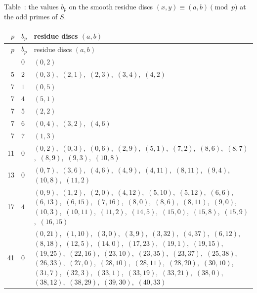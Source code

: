 \documentclass[11pt]{article}
\newcounter{dtab}
\begin{document}
{\footnotesize\setlength{\tabcolsep}{4pt}\setlength{\LTpre}{6pt}\setlength{\LTpost}{3pt}\renewcommand{\arraystretch}{1.05}
\begin{center}
\label{tab:local8odd}
Table~\thedtab: the values $b_p$ on the smooth residue discs $(x,y)\equiv(a,b)\pmod p$ at the odd primes of $S$.
\end{center}
\begin{longtable}{@{}rl>{\raggedright\arraybackslash}p{}@{}}
\toprule $p$ & $b_p$ & residue discs $(a,b)$\\\midrule\endfirsthead
\toprule $p$ & $b_p$ & residue discs $(a,b)$\\\midrule\endhead\bottomrule\endfoot
3 & $0$ & $(0,2)$\\
5 & $2$ & $(0,3)$,\allowbreak\ $(2,1)$,\allowbreak\ $(2,3)$,\allowbreak\ $(3,4)$,\allowbreak\ $(4,2)$\\
7 & $1$ & $(0,5)$\\
7 & $4$ & $(5,1)$\\
7 & $5$ & $(2,2)$\\
7 & $6$ & $(0,4)$,\allowbreak\ $(3,2)$,\allowbreak\ $(4,6)$\\
7 & $7$ & $(1,3)$\\
11 & $0$ & $(0,2)$,\allowbreak\ $(0,3)$,\allowbreak\ $(0,6)$,\allowbreak\ $(2,9)$,\allowbreak\ $(5,1)$,\allowbreak\ $(7,2)$,\allowbreak\ $(8,6)$,\allowbreak\ $(8,7)$,\allowbreak\ $(8,9)$,\allowbreak\ $(9,3)$,\allowbreak\ $(10,8)$\\
13 & $0$ & $(0,7)$,\allowbreak\ $(3,6)$,\allowbreak\ $(4,6)$,\allowbreak\ $(4,9)$,\allowbreak\ $(4,11)$,\allowbreak\ $(8,11)$,\allowbreak\ $(9,4)$,\allowbreak\ $(10,8)$,\allowbreak\ $(11,2)$\\
17 & $4$ & $(0,9)$,\allowbreak\ $(1,2)$,\allowbreak\ $(2,0)$,\allowbreak\ $(4,12)$,\allowbreak\ $(5,10)$,\allowbreak\ $(5,12)$,\allowbreak\ $(6,6)$,\allowbreak\ $(6,13)$,\allowbreak\ $(6,15)$,\allowbreak\ $(7,16)$,\allowbreak\ $(8,0)$,\allowbreak\ $(8,6)$,\allowbreak\ $(8,11)$,\allowbreak\ $(9,0)$,\allowbreak\ $(10,3)$,\allowbreak\ $(10,11)$,\allowbreak\ $(11,2)$,\allowbreak\ $(14,5)$,\allowbreak\ $(15,0)$,\allowbreak\ $(15,8)$,\allowbreak\ $(15,9)$,\allowbreak\ $(16,15)$\\
41 & $0$ & $(0,21)$,\allowbreak\ $(1,10)$,\allowbreak\ $(3,0)$,\allowbreak\ $(3,9)$,\allowbreak\ $(3,32)$,\allowbreak\ $(4,37)$,\allowbreak\ $(6,12)$,\allowbreak\ $(8,18)$,\allowbreak\ $(12,5)$,\allowbreak\ $(14,0)$,\allowbreak\ $(17,23)$,\allowbreak\ $(19,1)$,\allowbreak\ $(19,15)$,\allowbreak\ $(19,25)$,\allowbreak\ $(22,16)$,\allowbreak\ $(23,10)$,\allowbreak\ $(23,35)$,\allowbreak\ $(23,37)$,\allowbreak\ $(25,38)$,\allowbreak\ $(26,33)$,\allowbreak\ $(27,0)$,\allowbreak\ $(28,10)$,\allowbreak\ $(28,11)$,\allowbreak\ $(28,20)$,\allowbreak\ $(30,10)$,\allowbreak\ $(31,7)$,\allowbreak\ $(32,3)$,\allowbreak\ $(33,1)$,\allowbreak\ $(33,19)$,\allowbreak\ $(33,21)$,\allowbreak\ $(38,0)$,\allowbreak\ $(38,12)$,\allowbreak\ $(38,29)$,\allowbreak\ $(39,30)$,\allowbreak\ $(40,33)$\\

\end{longtable}}
\end{document}
